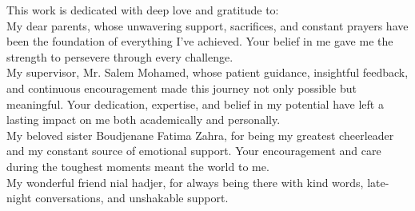 \thispagestyle{empty}
\vskip15mm
\begin{center}
\end{center}
\vfill 
\begin{center}
	\parbox{.85\linewidth}{\centering 
		\baselineskip=8mm 
		\selectfont 
		\Large 
This work is dedicated with deep love and gratitude to:
\\[5mm]
My dear parents,
whose unwavering support, sacrifices, and constant prayers have been the foundation of everything I’ve achieved. Your belief in me gave me the strength to persevere through every challenge.
\\[5mm]
My supervisor, Mr. Salem Mohamed,
whose patient guidance, insightful feedback, and continuous encouragement made this journey not only possible but meaningful. Your dedication, expertise, and belief in my potential have left a lasting impact on me both academically and personally.
\\[5mm]
My beloved sister Boudjenane Fatima Zahra,
for being my greatest cheerleader and my constant source of emotional support. Your encouragement and care during the toughest moments meant the world to me.
\\[5mm]
My wonderful friend nial hadjer,
for always being there with kind words, late-night conversations, and unshakable support.
\\[19mm]
}
\end{center}
\vfill 
\thispagestyle{empty}